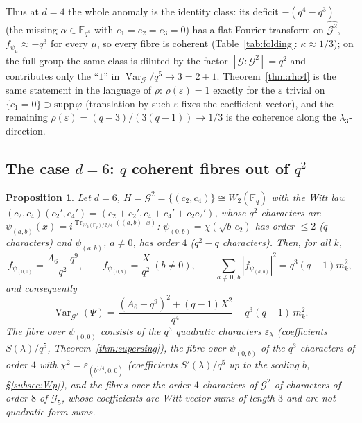 \documentclass[11pt,a4paper]{amsart}
\newtheorem{proposition}[theorem]{Proposition}
\theoremstyle{definition}
\newcommand{\F}{\mathbb{F}}
\newcommand{\Z}{\mathbb{Z}}
\newcommand{\G}{\mathcal{G}}
\newcommand{\Tr}{\operatorname{Tr}}
\newcommand{\Var}{\operatorname{Var}}
\newcommand{\eps}{\varepsilon}
\begin{document}
Thus at $d=4$ the whole anomaly is the identity class: its deficit $-(q^4-q^3)$ (the missing $\alpha\in\F_{q^8}$ with $e_1=e_2=e_3=0$) has a flat Fourier transform on $\widehat{\G^2}$, $f_{\psi_\mu}\approx-q^3$ for every $\mu$, so every fibre is coherent (Table~\ref{tab:folding}: $\kappa\approx1/3$); on the full group the same class is diluted by the factor $[\G:\G^2]=q^2$ and contributes only the ``$1$'' in $\Var_\G/q^5\to3=2+1$. Theorem~\ref{thm:rho4} is the same statement in the language of $\rho$: $\rho(\eps)=1$ exactly for the $\eps$ trivial on $\{c_1=0\}\supset\mathrm{supp}\,\varphi$ (translation by such $\eps$ fixes the coefficient vector), and the remaining $\rho(\eps)=(q-3)/(3(q-1))\to1/3$ is the coherence along the $\lambda_3$-direction.

\subsection{The case \texorpdfstring{$d=6$}{d=6}: \texorpdfstring{$q$}{q} coherent fibres out of \texorpdfstring{$q^2$}{q2}}
\begin{proposition}\label{prop:folding6}
Let $d=6$, $H=\G^2=\{(c_2,c_4)\}\cong W_2(\F_q)$ with the Witt law $(c_2,c_4)(c_2',c_4')=(c_2+c_2',c_4+c_4'+c_2c_2')$, whose $q^2$ characters are $\psi_{(a,b)}(x)=i^{\Tr_{W_2(\F_q)/\Z/4}((a,b)\cdot x)}$: $\psi_{(0,b)}=\chi(\sqrt b\,c_2)$ has order $\le2$ ($q$ characters) and $\psi_{(a,b)}$, $a\ne0$, has order $4$ ($q^2-q$ characters). Then, for all $k$,
\[
f_{\psi_{(0,0)}}=\frac{A_6-q^9}{q^2},\qquad f_{\psi_{(0,b)}}=\frac{X}{q^2}\ (b\ne0),\qquad \sum_{a\ne0,\,b}|f_{\psi_{(a,b)}}|^2=q^3(q-1)m_k^2 ,
\]
and consequently
\begin{equation}\label{eq:varfold}
\Var_{\G^2}(\Psi)=\frac{(A_6-q^9)^2+(q-1)X^2}{q^4}+q^3(q-1)\,m_k^2 .
\end{equation}
The fibre over $\psi_{(0,0)}$ consists of the $q^3$ quadratic characters $\eps_\lambda$ (coefficients $S(\lambda)/q^5$, Theorem~\ref{thm:supersing}), the fibre over $\psi_{(0,b)}$ of the $q^3$ characters of order $4$ with $\chi^2=\eps_{(b^{1/4},0,0)}$ (coefficients $S'(\lambda)/q^5$ up to the scaling $b$, \S\ref{subsec:Wp}), and the fibres over the order-$4$ characters of $\G^2$ of characters of order $8$ of $\G_5$, whose coefficients are Witt-vector sums of length $3$ and are not quadratic-form sums.
\end{proposition}
\end{document}
